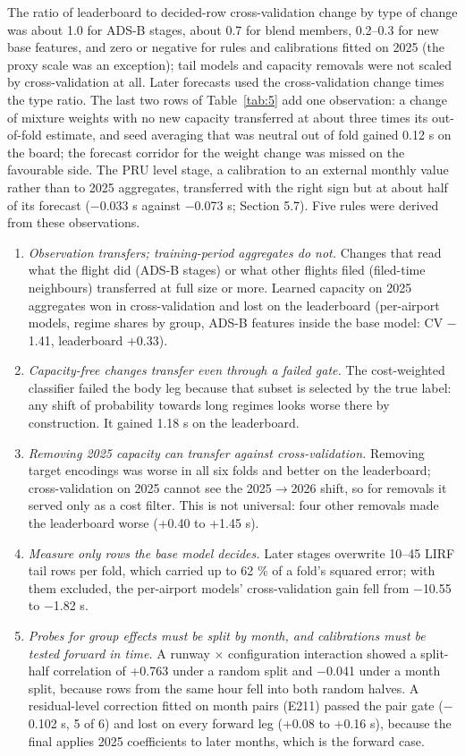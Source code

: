 \documentclass[
  manuscript=article,  %
  layout=preprint,     %
  year=2026,
  volume=4,
]{extra/joas}
\providecommand{\tightlist}{\setlength{\itemsep}{0pt}\setlength{\parskip}{0pt}}
\begin{document}
The ratio of leaderboard to decided-row cross-validation change by type of change was about 1.0 for ADS-B stages, about 0.7 for blend members, 0.2--0.3 for new base features, and zero or negative for rules and calibrations fitted on 2025 (the proxy scale was an exception); tail models and capacity removals were not scaled by cross-validation at all. Later forecasts used the cross-validation change times the type ratio. The last two rows of Table~\ref{tab:5} add one observation: a change of mixture weights with no new capacity transferred at about three times its out-of-fold estimate, and seed averaging that was neutral out of fold gained 0.12 s on the board; the forecast corridor for the weight change was missed on the favourable side. The PRU level stage, a calibration to an external monthly value rather than to 2025 aggregates, transferred with the right sign but at about half of its forecast ($-$0.033 s against $-$0.073 s; Section 5.7). Five rules were derived from these observations.

\begin{enumerate}
\def\labelenumi{\arabic{enumi}.}
\tightlist
\item
  \emph{Observation transfers; training-period aggregates do not.} Changes that read what the flight did (ADS-B stages) or what other flights filed (filed-time neighbours) transferred at full size or more. Learned capacity on 2025 aggregates won in cross-validation and lost on the leaderboard (per-airport models, regime shares by group, ADS-B features inside the base model: CV $-$1.41, leaderboard +0.33).
\item
  \emph{Capacity-free changes transfer even through a failed gate.} The cost-weighted classifier failed the body leg because that subset is selected by the true label: any shift of probability towards long regimes looks worse there by construction. It gained 1.18 s on the leaderboard.
\item
  \emph{Removing 2025 capacity can transfer against cross-validation.} Removing target encodings was worse in all six folds and better on the leaderboard; cross-validation on 2025 cannot see the 2025$\rightarrow$2026 shift, so for removals it served only as a cost filter. This is not universal: four other removals made the leaderboard worse (+0.40 to +1.45 s).
\item
  \emph{Measure only rows the base model decides.} Later stages overwrite 10--45 LIRF tail rows per fold, which carried up to 62 \% of a fold's squared error; with them excluded, the per-airport models' cross-validation gain fell from $-$10.55 to $-$1.82 s.
\item
  \emph{Probes for group effects must be split by month, and calibrations must be tested forward in time.} A runway $\times$ configuration interaction showed a split-half correlation of +0.763 under a random split and $-$0.041 under a month split, because rows from the same hour fell into both random halves. A residual-level correction fitted on month pairs (E211) passed the pair gate ($-$0.102 s, 5 of 6) and lost on every forward leg (+0.08 to +0.16 s), because the final applies 2025 coefficients to later months, which is the forward case.
\end{enumerate}
\end{document}
